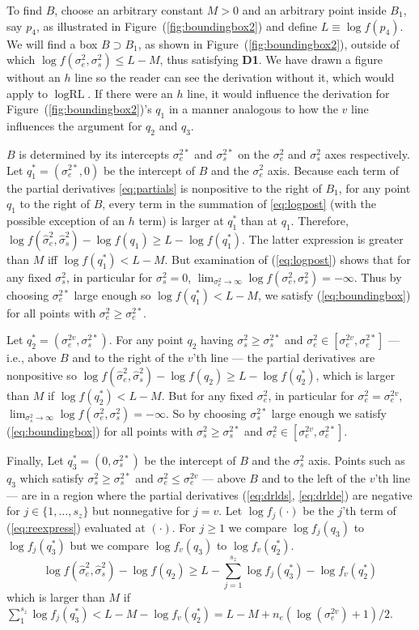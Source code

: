\documentclass{report}
\newcommand{\RL}{f}
\newcommand{\RLorig}{\text{RL}}
\newcommand{\logRL}{\log\RL}
\newcommand{\logRLorig}{\log\RLorig}
\newcommand{\sigssq}{\sigma_s^2}
\newcommand{\sigesq}{\sigma_e^2}
\newcommand{\sshat}{\hat\sigma^2_e,\hat\sigma^2_s}
\newcommand{\logRLss}{\logRL(\sigesq,\sigssq)}
\begin{document}
To find $B$, choose an arbitrary constant $M>0$ and an arbitrary point inside $B_1$, say $p_4$, as illustrated in Figure~(\ref{fig:boundingbox2}) and define $L \equiv \logRL(p_4)$.  We will find a box $B\supset B_1$, as shown in Figure~(\ref{fig:boundingbox2}), outside of which $\logRLss \le L-M$, thus satisfying \textbf{D1}.  We have drawn a figure without an $h$ line so the reader can see  the derivation without it, which would apply to $\logRLorig$.  If there were an $h$ line, it would influence the derivation for Figure~(\ref{fig:boundingbox2})'s $q_1$ in a manner analogous to how the $v$ line influences the argument for $q_2$ and $q_3$.

$B$ is determined by its intercepts $\sigma_e^{2*}$ and $\sigma_s^{2*}$ on the $\sigesq$ and $\sigssq$ axes respectively.  Let $q_1^* = (\sigma_e^{2*},0)$ be the intercept of $B$ and the $\sigesq$ axis.  Because each term of the partial derivatives \eqref{eq:partials} is nonpositive to the right of $B_1$, for any point $q_1$ to the right of $B$, every term in the summation of \eqref{eq:logpost} (with the possible exception of an $h$ term) is larger at $q_1^*$ than at $q_1$.  Therefore, $\logRL(\sshat) - \logRL(q_1) \ge L - \logRL(q_1^*)$.  The latter expression is greater than $M$ iff $\logRL(q_1^*) < L-M$.  But examination of (\ref{eq:logpost}) shows that for any fixed $\sigssq$, in particular for $\sigssq=0$, $\lim_{\sigesq \rightarrow \infty} \logRLss = -\infty$.  Thus by choosing $\sigma_e^{2*}$ large enough so $\logRL(q_1^*) < L-M$, we satisfy (\ref{eq:boundingbox}) for all points with $\sigesq \ge \sigma_e^{2*}$.

Let $q_2^* = (\sigma_e^{2v},\sigma_s^{2*})$.  For any point $q_2$ having $\sigssq \ge \sigma_s^{2*}$ and $\sigesq \in [\sigma_e^{2v}, \sigma_e^{2*}]$ --- i.e., above $B$ and to the right of the $v$'th line --- the partial derivatives are nonpositive so $\logRL(\sshat) - \logRL(q_2) \ge L - \logRL(q_2^*)$, which is larger than $M$ if $\logRL(q_2^*) < L-M$.  But for any fixed $\sigesq$, in particular for $\sigesq=\sigma_e^{2v}$, $\lim_{\sigssq \rightarrow \infty} \logRLss = -\infty$.  So by choosing $\sigma_s^{2*}$ large enough we satisfy (\ref{eq:boundingbox}) for all points with $\sigssq \ge \sigma_s^{2*}$ and $\sigesq \in [\sigma_e^{2v}, \sigma_e^{2*}]$.

Finally, Let $q_3^* = (0,\sigma_s^{2*})$ be the intercept of $B$ and the $\sigssq$ axis.  Points such as $q_3$ which satisfy $\sigssq \ge \sigma_s^{2*}$ and $\sigesq \le \sigma_e^{2v}$ --- above $B$ and to the left of the $v$'th line --- are in a region where the partial derivatives (\ref{eq:drlds}, \ref{eq:drlde}) are negative for $j \in \{1, \dots, s_z\}$ but nonnegative for $j=v$.  Let $\logRL_j(\cdot)$ be the $j$'th term of (\ref{eq:reexpress}) evaluated at $(\cdot)$.  For $j\ge1$ we compare $\logRL_j(q_3)$ to $\logRL_j(q_3^*)$ but we compare $\logRL_v(q_3)$ to $\logRL_v(q_2^*)$.
\begin{equation}
	\logRL(\sshat) - \logRL(q_2) \ge L - \sum_{j=1}^{s_z} \logRL_j(q_3^*) - \logRL_v(q_2^*)
\end{equation}
which is larger than $M$ if $\sum_{1}^{s_z} \logRL_j(q_3^*) < L - M - \logRL_v(q_2^*) = L - M + n_e(\log(\sigma_e^{2v}) + 1)/2$.
\end{document}
